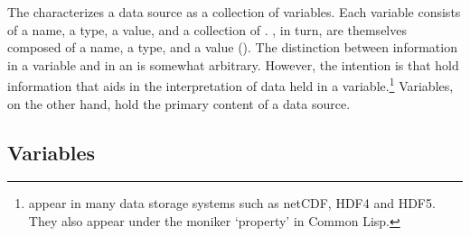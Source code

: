 \documentclass[justify]{nasa-ese}
\begin{document}
The \DAP characterizes a data source as a collection of variables. Each
variable consists of a name, a type, a value, and a collection of
\Attributes. \Attributes, in turn, are themselves composed of a name, a type,
and a value (). The distinction between
information in a variable and in an \Attribute is somewhat arbitrary.
However, the intention is that \Attributes hold information that aids in the
interpretation of data held in a variable.\footnote{\Attributes appear in
many data storage systems such as netCDF\cite{netcdf}, HDF4\cite{NCSA:HDF4}
and HDF5\cite{NCSA:HDF5}. They also appear under the moniker `property' in
Common Lisp\cite{steele:clisp}.} Variables, on the other hand, hold the
primary content of a data source.





\subsection{Variables}
\label{sec-variables}
\end{document}
